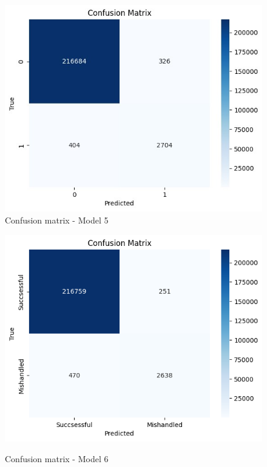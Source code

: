 \documentclass[12pt]{article}
\begin{document}
\begin{figure}
\begin{minipage}[c]{0.45\linewidth}
\includegraphics[width=1\textwidth]{Confusion_matrix_Model 5.jpg}\\
\caption{Confusion matrix - Model 5}
\end{minipage}
\hfill
\begin{minipage}[c]{0.45\linewidth}
    \includegraphics[width=1\textwidth]{Confusion_matrix_Model 6.png}\\
    \caption{Confusion matrix - Model 6}
\end{minipage}%
\end{figure}
\end{document}

